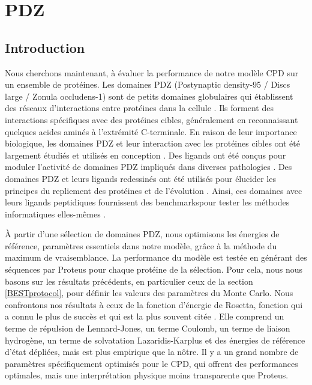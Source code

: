 \chapter{PDZ}
\label{chap:PDZ}

\section{Introduction}

Nous cherchons maintenant, à évaluer la performance de notre modèle CPD sur un ensemble de protéines. Les domaines PDZ (\og Postynaptic density-95 / Discs large / Zonula occludens-1\fg) sont de petits domaines globulaires qui établissent des réseaux d'interactions entre protéines dans la cellule \citep{Harris01,Hung02,Tonikian08,Gfeller11,Subbaiah11}. Ils forment des interactions spécifiques avec des protéines cibles, généralement en reconnaissant quelques acides aminés à l'extrémité C-terminale. En raison de leur importance biologique, les domaines PDZ et leur interaction avec les protéines cibles ont été largement étudiés et utilisés en conception . Des ligands ont été conçus  pour moduler l'activité de domaines PDZ impliqués dans diverses pathologies \citep{Roberts12,Zheng15}. Des domaines  PDZ et leurs  ligands redessinés ont été utilisés pour élucider les principes du repliement des protéines et de l'évolution \cite{Kong09,Mclaughlin12,Melero14}. Ainsi, ces domaines avec leurs ligands peptidiques fournissent des \og benchmarks\fg pour tester les méthodes informatiques elles-mêmes \cite{Reina02,Smith10}.

À partir d'une sélection de domaines PDZ, nous optimisons les énergies de référence, paramètres essentiels dans notre modèle, grâce à la méthode du maximum de vraisemblance. La performance du modèle est testée en générant des séquences par Proteus pour chaque protéine de la sélection. Pour cela, nous nous basons sur les résultats précédents, en particulier ceux de la section \ref{BESTprotocol}, pour définir les valeurs des paramètres du Monte Carlo. Nous confrontons nos résultats à ceux de la fonction d'énergie de Rosetta, fonction qui a connu le plus de succès et qui est la plus souvent citée \cite{Baker06}. Elle comprend un terme de répulsion de Lennard-Jones, un terme Coulomb, un terme de liaison hydrogène, un terme de solvatation Lazaridis-Karplus et des énergies de référence d'état dépliées, mais est plus empirique que la nôtre. Il y a un grand nombre de paramètres spécifiquement optimisés pour le CPD, qui offrent des performances optimales, mais une interprétation physique moins transparente que Proteus.
   

